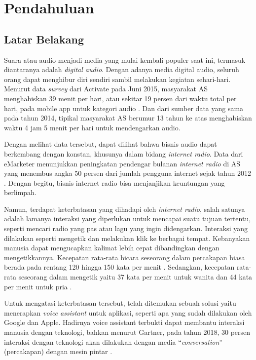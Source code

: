 \chapter{Pendahuluan}

\section{Latar Belakang}

Suara atau audio menjadi media yang mulai kembali populer saat ini, termasuk diantaranya adalah \textit{digital audio}. Dengan adanya media digital audio, seluruh orang dapat menghibur diri sendiri sambil melakukan kegiatan sehari-hari. Menurut data \textit{survey} dari Activate pada Juni 2015, masyarakat AS menghabiskan 39 menit per hari, atau sekitar 19 persen dari waktu total per hari, pada mobile app untuk kategori audio \parencite{activate2015tech}. Dan dari sumber data yang sama pada tahun 2014, tipikal masyarakat AS berumur 13 tahun ke atas menghabiskan waktu 4 jam 5 menit per hari untuk mendengarkan audio.

Dengan melihat data tersebut, dapat dilihat bahwa bisnis audio dapat berkembang dengan konstan, khusunya dalam bidang \textit{internet radio}. Data dari eMarketer menunjukkan peningkatan pendengar bulanan \textit{internet radio} di AS yang menembus angka 50 persen dari jumlah pengguna internet sejak tahun 2012 \parencite{2013internet}. Dengan begitu, bisnis internet radio bisa menjanjikan keuntungan yang berlimpah.

Namun, terdapat keterbatasan yang dihadapi oleh \textit{internet radio}, salah satunya adalah lamanya interaksi yang diperlukan untuk mencapai suatu tujuan tertentu, seperti mencari radio yang pas atau lagu yang ingin didengarkan. Interaksi yang dilakukan seperti mengetik dan melakukan klik ke berbagai tempat. Kebanyakan manusia dapat mengucapkan kalimat lebih cepat dibandingkan dengan mengetikkannya. Kecepatan rata-rata bicara seseorang dalam percakapan biasa berada pada rentang 120 hingga 150 kata per menit \parencite{barnard2018average}. Sedangkan, kecepatan rata-rata seseorang dalam mengetik yaitu 37 kata per menit untuk wanita dan 44 kata per menit untuk pria \parencite{ratatype}.

Untuk mengatasi keterbatasan tersebut, telah ditemukan sebuah solusi yaitu menerapkan \textit{voice assistant} untuk aplikasi, seperti apa yang sudah dilakukan oleh Google dan Apple. Hadirnya voice assistant terbukti dapat membantu interaksi manusia dengan teknologi, bahkan menurut Gartner, pada tahun 2018, 30 persen interaksi dengan teknologi akan dilakukan dengan media “\textit{conversation}” (percakapan) dengan mesin pintar \parencite{escherich2015market}.

